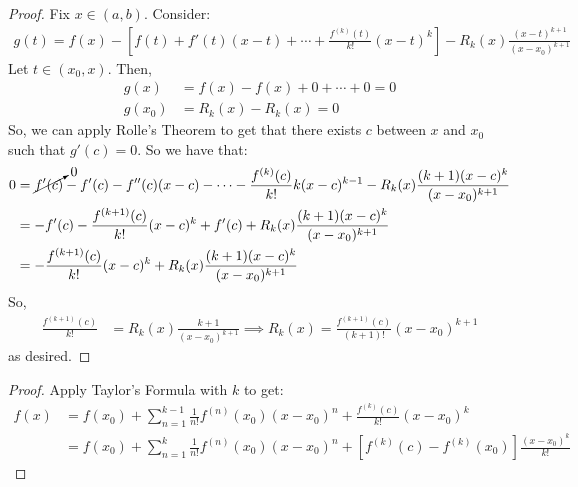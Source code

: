 \documentclass{report}
\begin{document}
\begin{proof}
    Fix $x \in (a, b)$. Consider:
    \begin{align*}
        g(t) = f(x) - \left[f(t) + f'(t)(x-t) + \cdots + \frac{f^{(k)}(t)}{k!}(x-t)^k\right] - R_k(x) \frac{(x-t)^{k+1}}{(x-x_0)^{k+1}}
    \end{align*}
    Let $t \in (x_0, x)$. Then,
    \begin{align*}
        g(x) &= f(x) - f(x) + 0 + \cdots + 0 = 0 \\
        g(x_0) &= R_k(x) - R_k(x) = 0
    \end{align*}
    So, we can apply Rolle's Theorem to get that there exists $c$ between $x$ and $x_0$ such that $g'(c) = 0$. So we have that:
    \begin{align*}
        0 &= \cancelto{0}{f'(c)} - f'(c) - f''(c)(x-c) - \cdots - \frac{f^{(k)}(c)}{k!}k(x-c)^{k-1} - R_k(x) \frac{(k+1)(x-c)^k}{(x-x_0)^{k+1}} \\
        &= -f'(c) - \frac{f^{(k+1)}(c)}{k!}(x-c)^k + f'(c) + R_k(x) \frac{(k+1)(x-c)^k}{(x-x_0)^{k+1}} \\
        &= -\dfrac{f^{(k+1)}(c)}{k!} (x-c)^k + R_k(x) \frac{(k+1)(x-c)^k}{(x-x_0)^{k+1}}
    \end{align*}
    So, 
    \begin{align*}
        \frac{f^{(k+1)}(c)}{k!} &= R_k(x) \frac{k+1}{(x-x_0)^{k+1}} 
        \implies R_k(x) = \frac{f^{(k+1)}(c)}{(k+1)!}(x-x_0)^{k+1}
    \end{align*}
    as desired.
\end{proof}
\begin{proof}
    Apply Taylor's Formula with $k$ to get:
    \begin{align*}
        f(x) &= f(x_0) + \sum_{n=1}^{k-1} \frac{1}{n!}f^{(n)}(x_0)(x-x_0)^n + \frac{f^{(k)}(c)}{k!}(x-x_0)^k \\
        &= f(x_0) + \sum_{n=1}^{k} \frac{1}{n!}f^{(n)}(x_0)(x-x_0)^n + [f^{(k)}(c) - f^{(k)}(x_0)]\frac{(x-x_0)^k}{k!}
    \end{align*}
\end{proof}
\end{document}
